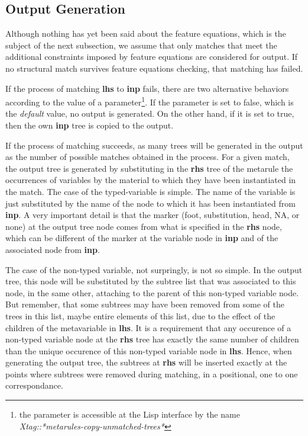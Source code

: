 \subsection{Output Generation}
\label{output-gen}

Although nothing has yet been said about the feature
equations, which is the subject of the next subsection, we assume that only
matches that meet the additional constraints imposed by feature equations
are considered for output. If no structural match survives feature equations
checking, that matching has failed.

If the process of matching {\bf lhs} to {\bf inp} fails, there are two 
alternative behaviors according to the value of a parameter\footnote{the
parameter is accessible at the Lisp interface by the name 
{\it Xtag::*metarules-copy-unmatched-trees*}}. 
If the parameter is set to false, which is the {\it default} value, 
no output is generated. 
On the other hand, if 
it is set to true, then the own {\bf inp} tree is copied to the output.

If the process of matching succeeds, as many trees will be generated in the
output as the number of possible matches obtained in the process. For a 
given match, the output tree is generated by substituting in the {\bf rhs} tree
of the metarule the occurrences of variables by the material to which they have
been instantiated in the match. The case of the typed-variable is simple. 
The name of the variable is just substituted by the name of the node to which
it has been instantiated from {\bf inp}. A very important detail is that the
marker (foot, substitution, head, NA, or none) at the output tree node comes 
from what is specified in the {\bf rhs} node, which can be different of the
marker at the variable node in {\bf inp} and of the associated node from 
{\bf inp}.

The case of the non-typed variable, not surpringly, is not so simple. 
In the output tree, this node
will be substituted by the subtree list that was associated to this node,
in the same other, attaching to the parent of this non-typed variable node.
But remember, that some subtrees may have been removed from some of the trees
in this list, maybe entire elements of this list, due to the effect of the
children of the metavariable in {\bf lhs}. 
It is a 
requirement that any occurence of a non-typed variable node at the {\bf rhs}
tree has exactly the same number of children than the unique occurence of
this non-typed variable node in {\bf lhs}. Hence, when generating the output
tree, the subtrees at {\bf rhs}
will be inserted exactly at the points where subtrees were removed during 
matching, in a positional, one to one correspondance.

